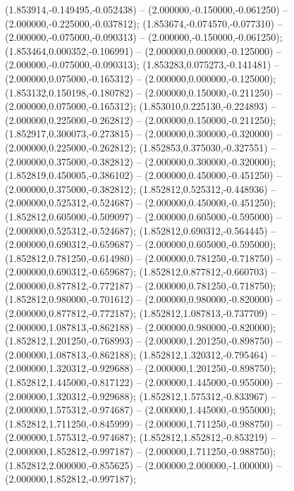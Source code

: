  (1.853914,-0.149495,-0.052438) -- (2.000000,-0.150000,-0.061250) -- (2.000000,-0.225000,-0.037812);
 (1.853674,-0.074570,-0.077310) -- (2.000000,-0.075000,-0.090313) -- (2.000000,-0.150000,-0.061250);
 (1.853464,0.000352,-0.106991) -- (2.000000,0.000000,-0.125000) -- (2.000000,-0.075000,-0.090313);
 (1.853283,0.075273,-0.141481) -- (2.000000,0.075000,-0.165312) -- (2.000000,0.000000,-0.125000);
 (1.853132,0.150198,-0.180782) -- (2.000000,0.150000,-0.211250) -- (2.000000,0.075000,-0.165312);
 (1.853010,0.225130,-0.224893) -- (2.000000,0.225000,-0.262812) -- (2.000000,0.150000,-0.211250);
 (1.852917,0.300073,-0.273815) -- (2.000000,0.300000,-0.320000) -- (2.000000,0.225000,-0.262812);
 (1.852853,0.375030,-0.327551) -- (2.000000,0.375000,-0.382812) -- (2.000000,0.300000,-0.320000);
 (1.852819,0.450005,-0.386102) -- (2.000000,0.450000,-0.451250) -- (2.000000,0.375000,-0.382812);
 (1.852812,0.525312,-0.448936) -- (2.000000,0.525312,-0.524687) -- (2.000000,0.450000,-0.451250);
 (1.852812,0.605000,-0.509097) -- (2.000000,0.605000,-0.595000) -- (2.000000,0.525312,-0.524687);
 (1.852812,0.690312,-0.564445) -- (2.000000,0.690312,-0.659687) -- (2.000000,0.605000,-0.595000);
 (1.852812,0.781250,-0.614980) -- (2.000000,0.781250,-0.718750) -- (2.000000,0.690312,-0.659687);
 (1.852812,0.877812,-0.660703) -- (2.000000,0.877812,-0.772187) -- (2.000000,0.781250,-0.718750);
 (1.852812,0.980000,-0.701612) -- (2.000000,0.980000,-0.820000) -- (2.000000,0.877812,-0.772187);
 (1.852812,1.087813,-0.737709) -- (2.000000,1.087813,-0.862188) -- (2.000000,0.980000,-0.820000);
 (1.852812,1.201250,-0.768993) -- (2.000000,1.201250,-0.898750) -- (2.000000,1.087813,-0.862188);
 (1.852812,1.320312,-0.795464) -- (2.000000,1.320312,-0.929688) -- (2.000000,1.201250,-0.898750);
 (1.852812,1.445000,-0.817122) -- (2.000000,1.445000,-0.955000) -- (2.000000,1.320312,-0.929688);
 (1.852812,1.575312,-0.833967) -- (2.000000,1.575312,-0.974687) -- (2.000000,1.445000,-0.955000);
 (1.852812,1.711250,-0.845999) -- (2.000000,1.711250,-0.988750) -- (2.000000,1.575312,-0.974687);
 (1.852812,1.852812,-0.853219) -- (2.000000,1.852812,-0.997187) -- (2.000000,1.711250,-0.988750);
 (1.852812,2.000000,-0.855625) -- (2.000000,2.000000,-1.000000) -- (2.000000,1.852812,-0.997187);
